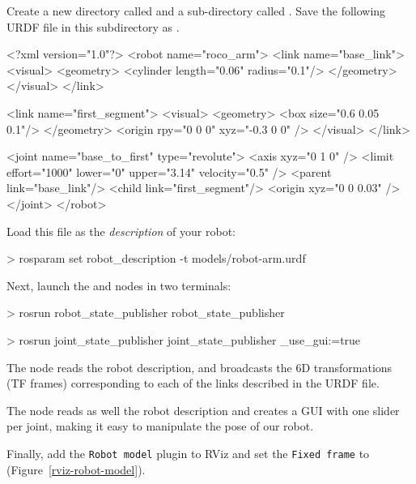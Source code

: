 \documentclass{instructions}
\begin{document}
Create a new directory called  and a sub-directory called
. Save the following URDF file in this subdirectory as
.


\begin{xmlcode}
<?xml version="1.0"?>
<robot name="roco_arm">
  <link name="base_link">
    <visual>
      <geometry>
        <cylinder length="0.06" radius="0.1"/>
      </geometry>
    </visual>
  </link>

  <link name="first_segment">
    <visual>
      <geometry>
        <box size="0.6 0.05 0.1"/>
      </geometry>
      <origin rpy="0 0 0" xyz="-0.3 0 0" />
    </visual>
  </link>

  <joint name="base_to_first" type="revolute">
    <axis xyz="0 1 0" />
    <limit effort="1000" lower="0"
                    upper="3.14" velocity="0.5" />
    <parent link="base_link"/>
    <child link="first_segment"/>
    <origin xyz="0 0 0.03" />
  </joint>
</robot>
\end{xmlcode}

Load this file as the \emph{description} of your robot: 

\begin{shcode}
> rosparam set robot_description -t models/robot-arm.urdf
\end{shcode}

Next, launch the  and  nodes
in two terminals:

\begin{shcode}
> rosrun robot_state_publisher robot_state_publisher
\end{shcode}

\begin{shcode}
> rosrun joint_state_publisher joint_state_publisher _use_gui:=true
\end{shcode}


The  node reads the robot description, and broadcasts the 6D transformations (TF
frames) corresponding to each of the links described in the URDF file.

The  node reads as well the robot description and
creates a GUI with one slider per joint, making it easy to manipulate the
pose of our robot.

Finally, add the \texttt{Robot model} plugin to RViz and set the \texttt{Fixed
frame} to  (Figure~\ref{rviz-robot-model}).
\end{document}
